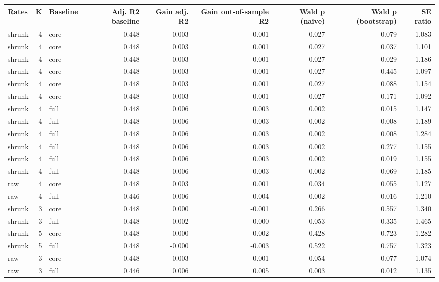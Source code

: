 \begin{tabular}{lrlrrrrrr}
\toprule
Rates & K & Baseline & Adj. R2 baseline & Gain adj. R2 & Gain out-of-sample R2 & Wald p (naive) & Wald p (bootstrap) & SE ratio \\
\midrule
shrunk & 4 & core & 0.448 & 0.003 & 0.001 & 0.027 & 0.079 & 1.083 \\
shrunk & 4 & core & 0.448 & 0.003 & 0.001 & 0.027 & 0.037 & 1.101 \\
shrunk & 4 & core & 0.448 & 0.003 & 0.001 & 0.027 & 0.029 & 1.186 \\
shrunk & 4 & core & 0.448 & 0.003 & 0.001 & 0.027 & 0.445 & 1.097 \\
shrunk & 4 & core & 0.448 & 0.003 & 0.001 & 0.027 & 0.088 & 1.154 \\
shrunk & 4 & core & 0.448 & 0.003 & 0.001 & 0.027 & 0.171 & 1.092 \\
shrunk & 4 & full & 0.448 & 0.006 & 0.003 & 0.002 & 0.015 & 1.147 \\
shrunk & 4 & full & 0.448 & 0.006 & 0.003 & 0.002 & 0.008 & 1.189 \\
shrunk & 4 & full & 0.448 & 0.006 & 0.003 & 0.002 & 0.008 & 1.284 \\
shrunk & 4 & full & 0.448 & 0.006 & 0.003 & 0.002 & 0.277 & 1.155 \\
shrunk & 4 & full & 0.448 & 0.006 & 0.003 & 0.002 & 0.019 & 1.155 \\
shrunk & 4 & full & 0.448 & 0.006 & 0.003 & 0.002 & 0.069 & 1.185 \\
raw & 4 & core & 0.448 & 0.003 & 0.001 & 0.034 & 0.055 & 1.127 \\
raw & 4 & full & 0.446 & 0.006 & 0.004 & 0.002 & 0.016 & 1.210 \\
shrunk & 3 & core & 0.448 & 0.000 & -0.001 & 0.266 & 0.557 & 1.340 \\
shrunk & 3 & full & 0.448 & 0.002 & 0.000 & 0.053 & 0.335 & 1.465 \\
shrunk & 5 & core & 0.448 & -0.000 & -0.002 & 0.428 & 0.723 & 1.282 \\
shrunk & 5 & full & 0.448 & -0.000 & -0.003 & 0.522 & 0.757 & 1.323 \\
raw & 3 & core & 0.448 & 0.003 & 0.001 & 0.054 & 0.077 & 1.074 \\
raw & 3 & full & 0.446 & 0.006 & 0.005 & 0.003 & 0.012 & 1.135 \\
\bottomrule
\end{tabular}
